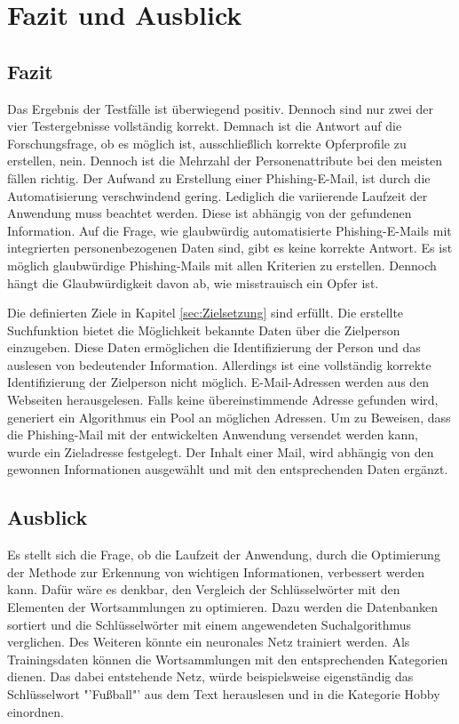 \chapter{Fazit und Ausblick}
\label{chap:SchlussUndAusblick}
\section{Fazit}
Das Ergebnis der Testfälle ist überwiegend positiv. Dennoch sind nur zwei der vier Testergebnisse vollständig korrekt. Demnach ist die Antwort auf die Forschungsfrage, ob es möglich ist, ausschließlich korrekte Opferprofile zu erstellen, nein. Dennoch ist die Mehrzahl der Personenattribute bei den meisten fällen richtig. Der Aufwand zu Erstellung einer Phishing-E-Mail, ist durch die Automatisierung verschwindend gering. Lediglich die variierende Laufzeit der Anwendung muss beachtet werden. Diese ist abhängig von der gefundenen Information. Auf die Frage, wie glaubwürdig automatisierte Phishing-E-Mails mit integrierten personenbezogenen Daten sind, gibt es keine korrekte Antwort. Es ist möglich glaubwürdige Phishing-Mails mit allen Kriterien zu erstellen. Dennoch hängt die Glaubwürdigkeit davon ab, wie misstrauisch ein Opfer ist.

Die definierten Ziele in Kapitel \ref{sec:Zielsetzung} sind erfüllt. Die erstellte Suchfunktion bietet die Möglichkeit bekannte Daten über die Zielperson einzugeben. Diese Daten ermöglichen die Identifizierung der Person und das auslesen von bedeutender Information. Allerdings ist eine vollständig korrekte Identifizierung der Zielperson nicht möglich. E-Mail-Adressen werden aus den Webseiten herausgelesen. Falls keine übereinstimmende Adresse gefunden wird, generiert ein Algorithmus ein Pool an möglichen Adressen. Um zu Beweisen, dass die Phishing-Mail mit der entwickelten Anwendung versendet werden kann, wurde ein Zieladresse festgelegt. Der Inhalt einer Mail, wird abhängig von den gewonnen Informationen ausgewählt und mit den entsprechenden Daten ergänzt.

\section{Ausblick}
Es stellt sich die Frage, ob die Laufzeit der Anwendung, durch die Optimierung der Methode zur Erkennung von wichtigen Informationen, verbessert werden kann. Dafür wäre es denkbar, den Vergleich der Schlüsselwörter mit den Elementen der Wortsammlungen zu optimieren. Dazu werden die Datenbanken sortiert und die Schlüsselwörter mit einem angewendeten Suchalgorithmus verglichen. Des Weiteren könnte ein neuronales Netz trainiert werden. Als Trainingsdaten können die Wortsammlungen mit den entsprechenden Kategorien dienen. Das dabei entstehende Netz, würde beispielsweise eigenständig das Schlüsselwort "'Fußball"' aus dem Text herauslesen und in die Kategorie Hobby einordnen. 

